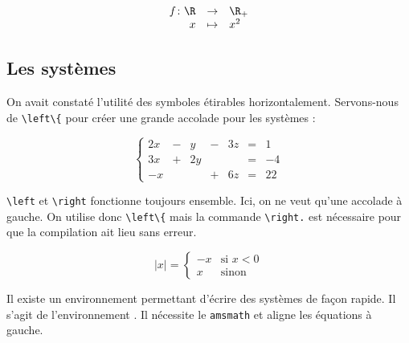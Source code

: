 \begin{SideBySideExample}
    \[\begin{array}{rcl}
        f \colon \R & \rightarrow & \R_+ \\
                    x & \mapsto & x^2
    \end{array}\]
\end{SideBySideExample}
\bigskip

\subsection{Les systèmes}\label{syst}

On avait constaté l'utilité des symboles étirables horizontalement. Servons-nous de \verb!\left\{! pour créer une grande accolade pour les systèmes :\bigskip

\begin{SideBySideExample}
    \[\left\{
    	\begin{array}{ccccccl}
    		2x & - & y & - & 3z & = & 1 \\
    		3x & + & 2y &  &  & = & -4 \\
    		-x &  &  & + & 6z & = & 22
    	\end{array}
    \right.\]
\end{SideBySideExample}
\bigskip

\begin{info}
    \texttt{\textbackslash left} et \texttt{\textbackslash right} fonctionne toujours ensemble. Ici, on ne veut qu'une accolade à gauche. On utilise donc \texttt{\textbackslash left\textbackslash\{} mais la commande \texttt{\textbackslash right.} est nécessaire pour que la compilation ait lieu sans erreur.
\end{info}

\begin{SideBySideExample}
    \[\lvert x \rvert =
    \left\{
    	\begin{array}{cl}
    		-x & \text{si } x < 0 \\
    		x & \text{sinon}
    	\end{array}
    \right.\]
\end{SideBySideExample}
\bigskip

Il existe un environnement permettant d'écrire des systèmes de façon rapide. Il s'agit de l'environnement . Il nécessite le  \texttt{amsmath} et aligne les équations à gauche.

\medskip

